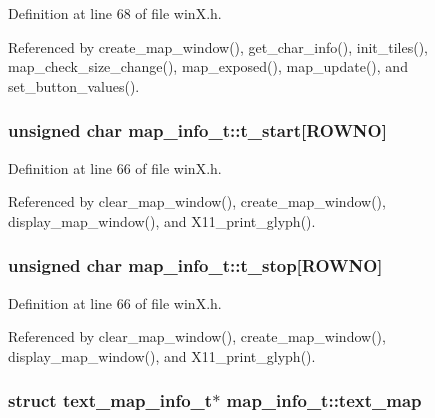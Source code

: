 Definition at line 68 of file win\+X.\+h.



Referenced by create\+\_\+map\+\_\+window(), get\+\_\+char\+\_\+info(), init\+\_\+tiles(), map\+\_\+check\+\_\+size\+\_\+change(), map\+\_\+exposed(), map\+\_\+update(), and set\+\_\+button\+\_\+values().

\hypertarget{structmap__info__t_a06005b4fcfad49d4b5ac9f9877d58e43}{
\subsubsection[{t\+\_\+start}]{\setlength{\rightskip}{0pt plus 5cm}unsigned char map\+\_\+info\+\_\+t\+::t\+\_\+start\mbox{[}{\bf R\+O\+W\+N\+O}\mbox{]}}}\label{structmap__info__t_a06005b4fcfad49d4b5ac9f9877d58e43}


Definition at line 66 of file win\+X.\+h.



Referenced by clear\+\_\+map\+\_\+window(), create\+\_\+map\+\_\+window(), display\+\_\+map\+\_\+window(), and X11\+\_\+print\+\_\+glyph().

\hypertarget{structmap__info__t_a9f9afbc4cf9ed122146ad91f9589379d}{
\subsubsection[{t\+\_\+stop}]{\setlength{\rightskip}{0pt plus 5cm}unsigned char map\+\_\+info\+\_\+t\+::t\+\_\+stop\mbox{[}{\bf R\+O\+W\+N\+O}\mbox{]}}}\label{structmap__info__t_a9f9afbc4cf9ed122146ad91f9589379d}


Definition at line 66 of file win\+X.\+h.



Referenced by clear\+\_\+map\+\_\+window(), create\+\_\+map\+\_\+window(), display\+\_\+map\+\_\+window(), and X11\+\_\+print\+\_\+glyph().

\hypertarget{structmap__info__t_a74f1e3443b492803837c6b2f56d65fd6}{
\subsubsection[{text\+\_\+map}]{\setlength{\rightskip}{0pt plus 5cm}struct {\bf text\+\_\+map\+\_\+info\+\_\+t}$\ast$ map\+\_\+info\+\_\+t\+::text\+\_\+map}}\label{structmap__info__t_a74f1e3443b492803837c6b2f56d65fd6}


